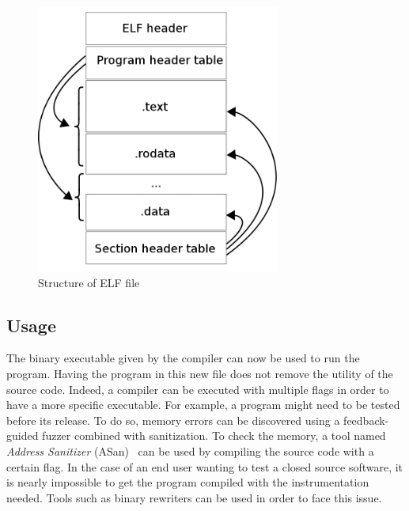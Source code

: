\documentclass[a4paper,11pt,oneside]{report}
\newcommand{\todobox}[3]{%
    \colorbox{#1}{\textcolor{white}{\sffamily\bfseries\scriptsize #2}}%
    ~\textcolor{blue}{#3} %
    \textcolor{#1}{$\triangleleft$}%
}
\newcommand{\nb}[1]{\todobox{orange}{Nicolas:}{#1}}
\begin{document}
\begin{figure}[h]
    \centering
    \includegraphics[width=8cm]{elf_structure.png} 
    \caption{Structure of ELF file}
    \label{fig:elf}
\end{figure}



%
\subsection{Usage}
The binary executable given by the compiler can now be used to run the program.
Having the program in this new file does not remove the utility of the source code.
Indeed, a compiler can be executed with multiple flags in order to have a more 
specific executable. For example, a program might need to be tested before its release.
To do so, memory errors can be discovered using a feedback-guided fuzzer
combined with sanitization.
To check the memory, a tool named \textit{Address Sanitizer} (ASan)~\cite{ASan}
can be used by compiling the source code with a certain flag.
In the case of an end user wanting to test a closed source software, it is
nearly impossible to get the program compiled with the instrumentation needed.
Tools such as binary rewriters can be used in order to face this issue.
\end{document}
